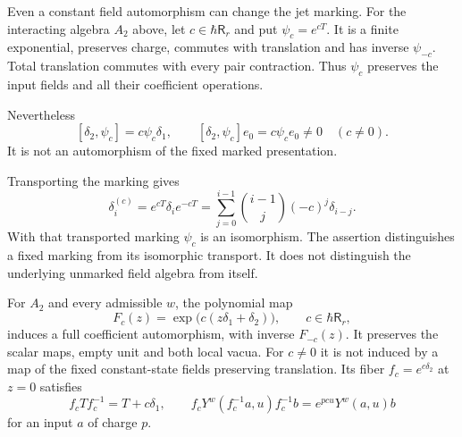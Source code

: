 \begin{example}\label{cycmp:ex:unmarked-translation}
Even a constant field automorphism can change the jet marking.
For the interacting algebra $A_2$ above, let $c\in\hbar\mathsf R_r$
and put $\psi_c=e^{cT}$. It is a finite exponential, preserves charge,
commutes with translation and has inverse $\psi_{-c}$.
Total translation commutes with every pair contraction. Thus
$\psi_c$ preserves the input fields and all their coefficient
operations.

Nevertheless
\[
 [\delta_2,\psi_c]=c\psi_c\delta_1,
 \qquad [\delta_2,\psi_c]e_0=c\psi_ce_0\ne0\quad(c\ne0).
\]
It is not an automorphism of the fixed marked presentation.

Transporting the marking gives
\[
 \delta_i^{(c)}=e^{cT}\delta_ie^{-cT}
     =\sum_{j=0}^{i-1}\binom{i-1}{j}(-c)^j\delta_{i-j}.
\]
With that transported marking $\psi_c$ is an isomorphism.
The assertion distinguishes a fixed marking from its isomorphic
transport. It does not distinguish the underlying unmarked field
algebra from itself.
\end{example}

\begin{proposition}\label{cycmp:prop:moving-framing}
For $A_2$ and every admissible $w$, the polynomial map
\[
 F_c(z)=\exp\bigl(c(z\delta_1+\delta_2)\bigr),
 \qquad c\in\hbar\mathsf R_r,
\]
induces a full coefficient automorphism, with inverse $F_{-c}(z)$.
It preserves the scalar maps, empty unit and both local vacua.
For $c\ne0$ it is not induced by a map of the fixed constant-state
fields preserving translation. Its fiber $f_c=e^{c\delta_2}$ at
$z=0$ satisfies
\begin{equation}\label{cycmp:eq:moving-framing}
 f_cTf_c^{-1}=T+c\delta_1,
 \qquad
 f_cY^w(f_c^{-1}a,u)f_c^{-1}b=e^{pcu}Y^w(a,u)b
\end{equation}
for an input $a$ of charge $p$.
\end{proposition}

